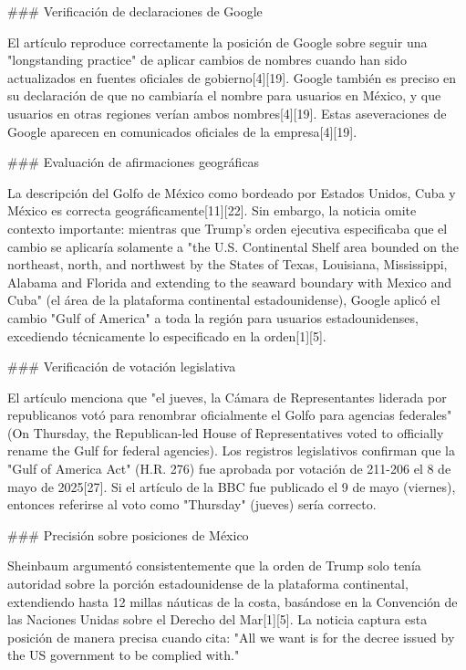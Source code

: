 \documentclass[10pt,a4paper]{article}
\begin{document}
\par\medskip
\#\#\# Verificaci\'{o}n de declaraciones de Google
\par\medskip
El art\'{i}culo reproduce correctamente la posici\'{o}n de Google sobre seguir una "longstanding practice" de aplicar cambios de nombres cuando han sido actualizados en fuentes oficiales de gobierno[4][19]. Google tambi\'{e}n es preciso en su declaraci\'{o}n de que no cambiar\'{i}a el nombre para usuarios en M\'{e}xico, y que usuarios en otras regiones ver\'{i}an ambos nombres[4][19]. Estas aseveraciones de Google aparecen en comunicados oficiales de la empresa[4][19].
\par\medskip
\#\#\# Evaluaci\'{o}n de afirmaciones geogr\'{a}ficas
\par\medskip
La descripci\'{o}n del Golfo de M\'{e}xico como bordeado por Estados Unidos, Cuba y M\'{e}xico es correcta geogr\'{a}ficamente[11][22]. Sin embargo, la noticia omite contexto importante: mientras que Trump's orden ejecutiva especificaba que el cambio se aplicar\'{i}a solamente a "the U.S. Continental Shelf area bounded on the northeast, north, and northwest by the States of Texas, Louisiana, Mississippi, Alabama and Florida and extending to the seaward boundary with Mexico and Cuba" (el \'{a}rea de la plataforma continental estadounidense), Google aplic\'{o} el cambio "Gulf of America" a toda la regi\'{o}n para usuarios estadounidenses, excediendo t\'{e}cnicamente lo especificado en la orden[1][5].
\par\medskip
\#\#\# Verificaci\'{o}n de votaci\'{o}n legislativa
\par\medskip
El art\'{i}culo menciona que "el jueves, la C\'{a}mara de Representantes liderada por republicanos vot\'{o} para renombrar oficialmente el Golfo para agencias federales" (On Thursday, the Republican-led House of Representatives voted to officially rename the Gulf for federal agencies). Los registros legislativos confirman que la "Gulf of America Act" (H.R. 276) fue aprobada por votaci\'{o}n de 211-206 el 8 de mayo de 2025[27]. Si el art\'{i}culo de la BBC fue publicado el 9 de mayo (viernes), entonces referirse al voto como "Thursday" (jueves) ser\'{i}a correcto.
\par\medskip
\#\#\# Precisi\'{o}n sobre posiciones de M\'{e}xico
\par\medskip
Sheinbaum argument\'{o} consistentemente que la orden de Trump solo ten\'{i}a autoridad sobre la porci\'{o}n estadounidense de la plataforma continental, extendiendo hasta 12 millas n\'{a}uticas de la costa, bas\'{a}ndose en la Convenci\'{o}n de las Naciones Unidas sobre el Derecho del Mar[1][5]. La noticia captura esta posici\'{o}n de manera precisa cuando cita: "All we want is for the decree issued by the US government to be complied with."
\end{document}
